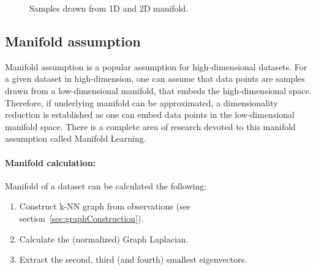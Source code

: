 \begin{figure}[H]
    \centering
    \caption{Samples drawn from 1D and 2D manifold.}
\end{figure}


\subsection{Manifold assumption}
\label{sec:manifoldAssumption}
Manifold assumption is a popular assumption for high-dimensional datasets.
For a given dataset in high-dimension, one can assume that data points are samples drawn from a low-dimensional manifold,
that embeds the high-dimensional space. 
Therefore, if underlying manifold can be approximated, a dimensionality reduction
is established as one can embed data points in the low-dimensional manifold space.
There is a complete area of research devoted to this manifold assumption called Manifold Learning\cite{ManifoldLearning}.

\paragraph{Manifold calculation:}
Manifold of a dataset can be calculated the following:

\begin{enumerate}
    \item Construct k-NN graph from observations (see section~\ref{sec:graphConstruction}).
    \item Calculate the (normalized) Graph Laplacian.
    \item Extract the second, third (and fourth) smallest eigenvectors.
\end{enumerate}


